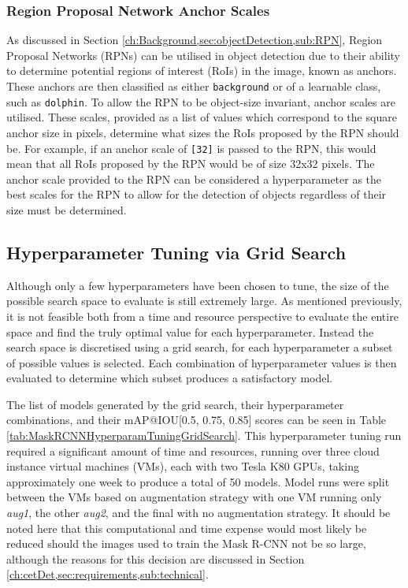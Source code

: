 \subsubsection{Region Proposal Network Anchor Scales}\label{ch:cetDet,sec:ModelSelection,sub:TrainingHyperparameters,subsub:RPNAnchorScales}

As discussed in Section \ref{ch:Background,sec:objectDetection,sub:RPN}, Region Proposal Networks (RPNs) can be utilised in object detection due to their ability to determine potential regions of interest (RoIs) in the image, known as anchors. These anchors are then classified as either \texttt{background} or of a learnable class, such as \texttt{dolphin}. To allow the RPN to be object-size invariant, anchor scales are utilised. These scales, provided as a list of values which correspond to the square anchor size in pixels, determine what sizes the RoIs proposed by the RPN should be. For example, if an anchor scale of \texttt{[32]} is passed to the RPN, this would mean that all RoIs proposed by the RPN would be of size 32x32 pixels. The anchor scale provided to the RPN can be considered a hyperparameter as the best scales for the RPN to allow for the detection of objects regardless of their size must be determined. 

\subsection{Hyperparameter Tuning via Grid Search}\label{ch:cetDet,sec:ModelSelection,sub:HyperparameterTuning}

Although only a few hyperparameters have been chosen to tune, the size of the possible search space to evaluate is still extremely large. As mentioned previously, it is not feasible both from a time and resource perspective to evaluate the entire space and find the truly optimal value for each hyperparameter. Instead the search space is discretised using a grid search, for each hyperparameter a subset of possible values is selected. Each combination of hyperparameter values is then evaluated to determine which subset produces a satisfactory model. 

The list of models generated by the grid search, their hyperparameter combinations, and their mAP@IOU[0.5, 0.75, 0.85] scores can be seen in Table \ref{tab:MaskRCNNHyperparamTuningGridSearch}. This hyperparameter tuning run required a significant amount of time and resources, running over three cloud instance virtual machines (VMs), each with two Tesla K80 GPUs, taking approximately one week to produce a total of 50 models. Model runs were split between the VMs based on augmentation strategy with one VM running only \textit{aug1}, the other \textit{aug2}, and the final with no augmentation strategy. It should be noted here that this computational and time expense would most likely be reduced should the images used to train the Mask R-CNN not be so large, although the reasons for this decision are discussed in Section \ref{ch:cetDet,sec:requirements,sub:technical}.


